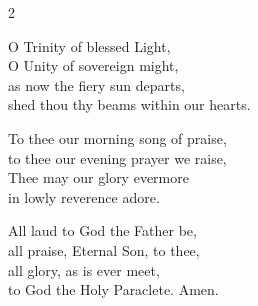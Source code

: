 \begin{multicols}{2}
\raggedcolumns
\begin{enpars}
O Trinity of blessed Light,\\
O Unity of sovereign might,\\
as now the fiery sun departs,\\
shed thou thy beams within our hearts.

To thee our morning song of praise,\\
to thee our evening prayer we raise,\\
Thee may our glory evermore\\
in lowly reverence adore.

All laud to God the Father be,\\
all praise, Eternal Son, to thee, \\
all glory, as is ever meet,\\
to God the Holy Paraclete.
Amen.
\end{enpars}
\end{multicols}